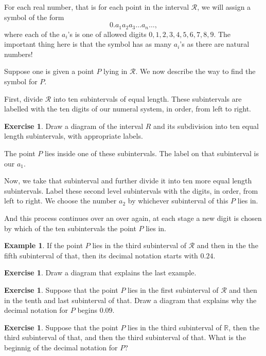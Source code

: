 \documentclass[12pt,letterpaper]{article}
\theoremstyle{definition}
\newtheorem{example}{Example}
\newtheorem{exercise}[question]{Exercise}
\begin{document}
For each real number, that is for each point in the interval $\mathcal{R}$, we will assign a symbol of the form 
\[
0.a_1a_2a_3\ldots a_n\ldots,
\]
where each of the $a_i$'s is one of allowed digits $0, 1, 2, 3, 4, 5, 6, 7, 8, 9$.
The important thing here is that the symbol has as many $a_i$'s as there are natural numbers!

Suppose one is given a point $P$ lying in $\mathcal{R}$.
We now describe the way to find the symbol for $P$.

First, divide $\mathcal{R}$ into ten subintervals of equal length.
These subintervals are labelled with the ten digits of our numeral system, in order, from left to right.

\begin{exercise}
Draw a diagram of the interval $R$ and its subdivision into ten equal length subintervals, with appropriate labels.
\end{exercise}

The point $P$ lies inside one of these subintervals. 
The label on that subinterval is our $a_1$.

Now, we take that subinterval and further divide it into ten more equal length subintervals. 
Label these second level subintervals with the digits, in order, from left to right.
We choose the number $a_2$ by whichever subinterval of this $P$ lies in.

And this process continues over an over again, at each stage a new digit is chosen by which of the ten subintervals the point $P$ lies in.

\begin{example}
If the point $P$ lies in the third subinterval of $\mathcal{R}$ and then in the  the fifth subinterval of that, then its decimal notation starts with $0.24$.
\end{example}

\begin{exercise}
Draw a diagram that explains the last example.
\end{exercise}

\begin{exercise}
Suppose that the point $P$ lies in the first subinterval of $\mathcal{R}$ and then in the tenth and last subinterval of that.
Draw a diagram that explains why the decimal notation for $P$ begins $0.09$.
\end{exercise}

\begin{exercise}
Suppose that the point $P$ lies in the third subinterval of $\mathbb{R}$, then the third subinterval of that, and then the third subinterval of that.
What is the beginnig of the decimal notation for $P$?
\end{exercise}
\end{document}
